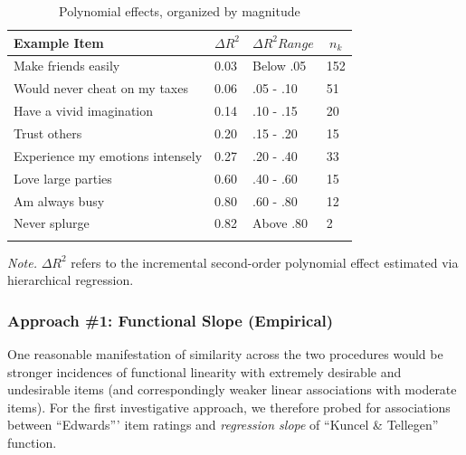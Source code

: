 \documentclass[
  ,jou]{apa6}
\begin{document}
\begin{table}[tbp]

\begin{center}
\begin{threeparttable}

\caption{\label{tab:polytable}Polynomial effects, organized by magnitude}

\begin{tabular}{llll}
\toprule
Example Item & \multicolumn{1}{c}{$\Delta R^2$} & \multicolumn{1}{c}{$\Delta R^2 Range$} & \multicolumn{1}{c}{$n_k$}\\
\midrule
Make friends easily & 0.03 & Below .05 & 152\\
Would never cheat on my taxes & 0.06 & .05 - .10 & 51\\
Have a vivid imagination & 0.14 & .10 - .15 & 20\\
Trust others & 0.20 & .15 - .20 & 15\\
Experience my emotions intensely & 0.27 & .20 - .40 & 33\\
Love large parties & 0.60 & .40 - .60 & 15\\
Am always busy & 0.80 & .60 - .80 & 12\\
Never splurge & 0.82 & Above .80 & 2\\
\bottomrule
\addlinespace
\end{tabular}

\begin{tablenotes}[para]
\normalsize{\textit{Note.} $\Delta R^2$ refers to the incremental second-order polynomial effect estimated via hierarchical regression.}
\end{tablenotes}

\end{threeparttable}
\end{center}

\end{table}

\hypertarget{approach-1-functional-slope-empirical}{%
\subsubsection{Approach \#1: Functional Slope (Empirical)}\label{approach-1-functional-slope-empirical}}

One reasonable manifestation of similarity across the two procedures would be stronger incidences of functional linearity with extremely desirable and undesirable items (and correspondingly weaker linear associations with moderate items). For the first investigative approach, we therefore probed for associations between ``Edwards''' item ratings and \emph{regression slope} of ``Kuncel \& Tellegen'' function.
\end{document}
